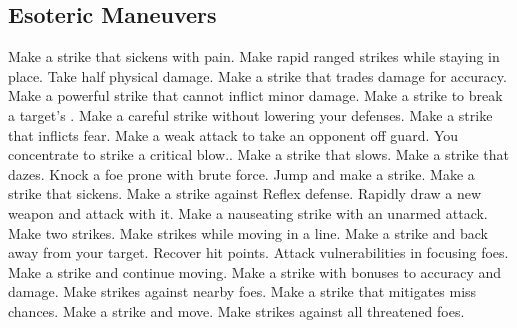 
\small
\subsection{Esoteric Maneuvers}\label{Esoteric Maneuvers}
\begin{spelllist}
 Make a strike that sickens with pain.
 Make rapid ranged strikes while staying in place.
 Take half physical damage.
 Make a strike that trades damage for accuracy.
 Make a powerful strike that cannot inflict minor damage.
 Make a strike to break a target's .
 Make a careful strike without lowering your defenses.
 Make a strike that inflicts fear.
 Make a weak attack to take an opponent off guard.
 You concentrate to strike a critical blow..
 Make a strike that slows.
 Make a strike that dazes.
 Knock a foe prone with brute force.
 Jump and make a strike.
 Make a strike that sickens.
 Make a strike against Reflex defense.
 Rapidly draw a new weapon and attack with it.
 Make a nauseating strike with an unarmed attack.
 Make two strikes.
 Make strikes while moving in a line.
 Make a strike and back away from your target.
 Recover hit points.
 Attack vulnerabilities in focusing foes.
 Make a strike and continue moving.
 Make a strike with bonuses to accuracy and damage.
 Make strikes against nearby foes.
 Make a strike that mitigates miss chances.
 Make a strike and move.
 Make strikes against all threatened foes.
\end{spelllist}



\small
